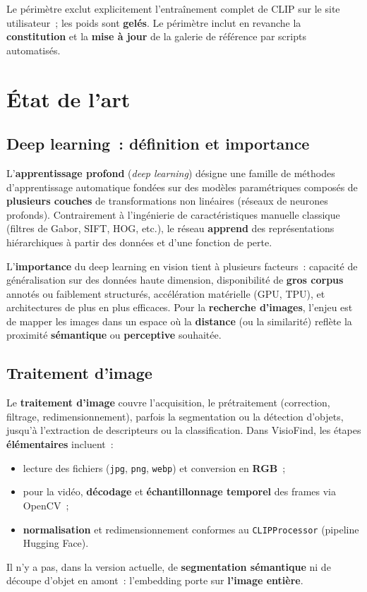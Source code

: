 \documentclass[11pt,a4paper,openany]{report}
\begin{document}
Le périmètre exclut explicitement l'entraînement complet de CLIP sur le site utilisateur~; les poids sont \textbf{gelés}. Le périmètre inclut en revanche la \textbf{constitution} et la \textbf{mise à jour} de la galerie de référence par scripts automatisés.

\chapter{État de l'art}
\label{chap:etat}

\section{Deep learning~: définition et importance}

L'\textbf{apprentissage profond} (\emph{deep learning}) désigne une famille de méthodes d'apprentissage automatique fondées sur des modèles paramétriques composés de \textbf{plusieurs couches} de transformations non linéaires (réseaux de neurones profonds). Contrairement à l'ingénierie de caractéristiques manuelle classique (filtres de Gabor, SIFT, HOG, etc.), le réseau \textbf{apprend} des représentations hiérarchiques à partir des données et d'une fonction de perte.

L'\textbf{importance} du deep learning en vision tient à plusieurs facteurs~: capacité de généralisation sur des données haute dimension, disponibilité de \textbf{gros corpus} annotés ou faiblement structurés, accélération matérielle (GPU, TPU), et architectures de plus en plus efficaces. Pour la \textbf{recherche d'images}, l'enjeu est de mapper les images dans un espace où la \textbf{distance} (ou la similarité) reflète la proximité \textbf{sémantique} ou \textbf{perceptive} souhaitée.

\section{Traitement d'image}

Le \textbf{traitement d'image} couvre l'acquisition, le prétraitement (correction, filtrage, redimensionnement), parfois la segmentation ou la détection d'objets, jusqu'à l'extraction de descripteurs ou la classification. Dans VisioFind, les étapes \textbf{élémentaires} incluent~:
\begin{itemize}[leftmargin=*]
  \item lecture des fichiers (\texttt{jpg}, \texttt{png}, \texttt{webp}) et conversion en \textbf{RGB}~;
  \item pour la vidéo, \textbf{décodage} et \textbf{échantillonnage temporel} des frames via OpenCV~;
  \item \textbf{normalisation} et redimensionnement conformes au \texttt{CLIPProcessor} (pipeline Hugging Face).
\end{itemize}
Il n'y a pas, dans la version actuelle, de \textbf{segmentation sémantique} ni de découpe d'objet en amont~: l'embedding porte sur \textbf{l'image entière}.
\end{document}

